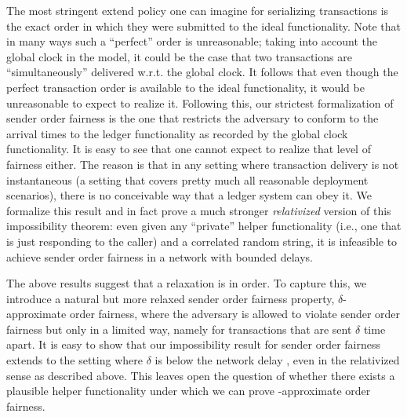 The most stringent extend policy one can imagine for serializing transactions is the exact order in which they were submitted to the ideal functionality.
%
Note that in many ways such a ``perfect'' order is unreasonable; taking into account the global clock in the model, it could be the case that two transactions are ``simultaneously'' delivered w.r.t. the global clock.
%
It follows that even though the perfect transaction order is available to the ideal functionality, it would be unreasonable to expect to realize it.
%
Following this, our strictest formalization of sender order fairness is the one that restricts the adversary to conform to the arrival times to the ledger functionality as recorded by the global clock functionality.
%
It is easy to see that one cannot expect to realize that level of fairness either.
%
The reason is that in any setting where transaction delivery is not instantaneous (a setting that covers pretty much all reasonable deployment scenarios), there is no conceivable way that a ledger system can obey it.
%
We formalize this result and in fact prove a much stronger \emph{relativized} version of this impossibility theorem: even given any ``private'' helper functionality (i.e., one that is just responding to the caller) and a correlated random string, it is infeasible to achieve sender order fairness in a network with bounded delays.

The above results suggest that a relaxation is in order.
%
To capture this, we introduce a natural but more relaxed sender order fairness property, $\delta$-approximate order fairness, where the adversary is allowed to violate sender order fairness but only in a limited way, namely for transactions that are sent $\delta$ time apart.
%
It is easy to show that our impossibility result for sender order fairness extends to the setting where $\delta$ is below the network delay \delay, even in the relativized sense as described above.
%
This leaves open the question of whether there exists a plausible helper functionality under which we can prove \delay-approximate order fairness.

